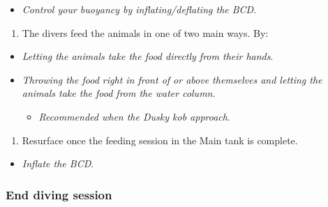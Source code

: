 \documentclass[
  12pt,
]{report}
\providecommand{\tightlist}{%
  \setlength{\itemsep}{0pt}\setlength{\parskip}{0pt}}\usepackage{longtable,booktabs,array}
\begin{document}
\begin{itemize}
\tightlist
\item
  \emph{Control your buoyancy by inflating/deflating the BCD}.
\end{itemize}

\begin{enumerate}
\def\labelenumi{\arabic{enumi}.}
\setcounter{enumi}{28}
\tightlist
\item
  The divers feed the animals in one of two main ways. By:
\end{enumerate}

\begin{itemize}
\tightlist
\item
  \emph{Letting the animals take the food directly from their hands}.
\item
  \emph{Throwing the food right in front of or above themselves and
  letting the animals take the food from the water column}.

  \begin{itemize}
  \tightlist
  \item
    \emph{Recommended when the Dusky kob approach}.
  \end{itemize}
\end{itemize}

\begin{enumerate}
\def\labelenumi{\arabic{enumi}.}
\setcounter{enumi}{29}
\tightlist
\item
  Resurface once the feeding session in the Main tank is complete.
\end{enumerate}

\begin{itemize}
\tightlist
\item
  \emph{Inflate the BCD}.
\end{itemize}

\hypertarget{end-diving-session}{%
\subsubsection{End diving session}\label{end-diving-session}}
\end{document}
